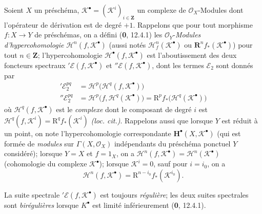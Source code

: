 \begin{env}[6.2.1]
Soient $X$ un préschéma,
$\mathscr K^\bullet=(\mathscr K^i)_{i\in\mathbf Z}$ un complexe de
$\mathscr O_X$-Modules dont l'opérateur de dérivation est de degré $+1$.
Rappelons que pour tout morphisme $f:X\to Y$ de préschémas, on a défini
(\textbf{0}, 12.4.1) les $\mathscr O_Y$-\emph{Modules d'hypercohomologie}
$\mathscr H^n(f,\mathscr K^\bullet)$ (aussi notés
$\mathscr H_f^n(\mathscr K^\bullet)$ ou
$\mathbf R^n f_*(\mathscr K^\bullet)$) pour tout $n\in\mathbf Z$;
l'hypercohomologie $\mathscr H^\bullet(f,\mathscr K^\bullet)$ est
l'aboutissement des deux foncteurs spectraux
$'\mathscr E(f,\mathscr K^\bullet)$ et
$''\mathscr E(f,\mathscr K^\bullet)$, dont les termes $\mathscr E_2$ sont
donnés par
\begin{align}
  '\mathscr E_2^{pq}
    &=\mathscr H^p\bigl(\mathscr H^q(f,\mathscr K^\bullet)\bigr)
    \tag{6.2.1.1}\label{III.6.2.1.1.fr}\\
  ''\mathscr E_2^{pq}
    &=\mathscr H^p\bigl(f,\mathscr H^q(\mathscr K^\bullet)\bigr)
      =\mathrm R^p f_*\bigl(\mathscr H^q(\mathscr K^\bullet)\bigr)
    \tag{6.2.1.2}\label{III.6.2.1.2.fr}
\end{align}
où $\mathscr H^q(f,\mathscr K^\bullet)$ est le \emph{complexe} dont le composant de
degré $i$ est
$\mathscr H^q(f,\mathscr K^i)=\mathrm R^q f_*(\mathscr K^i)$ \emph{(loc. cit.)}.
Rappelons aussi que lorsque $Y$ est réduit à un point, on note
l'hypercohomologie correspondante $\mathbf H^\bullet(X,\mathscr K^\bullet)$
(qui est formée de \emph{modules} sur $\Gamma(X,\mathscr O_X)$ indépendants du
préschéma ponctuel $Y$ considéré); lorsque $Y=X$ et $f=1_X$, on a
$\mathscr H^n(f,\mathscr K^\bullet)=\mathscr H^n(\mathscr K^\bullet)$
(cohomologie du complexe $\mathscr K^\bullet$); lorsque
$\mathscr K^i=0$, sauf pour $i=i_0$, on a
\[
  \mathscr H^n(f,\mathscr K^\bullet)
    =\mathrm R^{n-i_0}f_*(\mathscr K^{i_0}).
\]

La suite spectrale $'\mathscr E(f,\mathscr K^\bullet)$ est toujours
\emph{régulière}; les deux suites spectrales sont \emph{birégulières} lorsque
$K^\bullet$ est limité inférieurement (\textbf{0}, 12.4.1).


\end{env}
